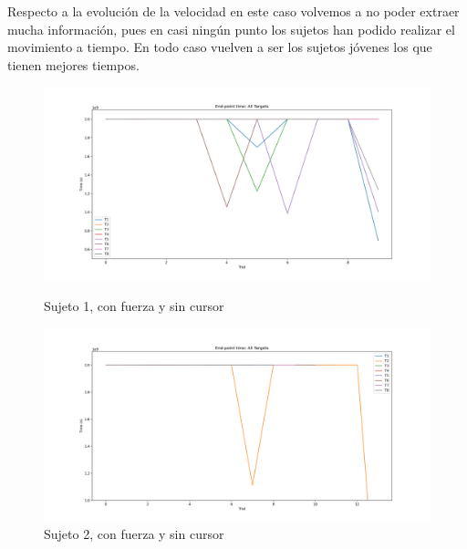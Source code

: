 \documentclass[a4paper,11pt, oneside]{book}
\begin{document}
Respecto a la evolución de la velocidad en este caso volvemos a no poder extraer mucha información, pues en casi ningún punto los sujetos han podido realizar el movimiento a tiempo. En todo caso vuelven a ser los sujetos jóvenes los que tienen mejores tiempos.

\begin{figure}[H]
	\begin{minipage}[b]{0.5\linewidth}
		\centering
		\includegraphics[width=\linewidth]{sujeto1/force_no_cursor/evolution_time}
		\caption{Sujeto 1, con fuerza y sin cursor}
		\label{fig:figura1}
	\end{minipage}
	\hspace{0.5cm}
	\begin{minipage}[b]{0.5\linewidth}
		\centering
		\includegraphics[width=\linewidth]{sujeto2/force_no_cursor/evolution_time}
		\caption{Sujeto 2, con fuerza y sin cursor}
		\label{fig:figura2}
	\end{minipage}
\end{figure}
\end{document}
